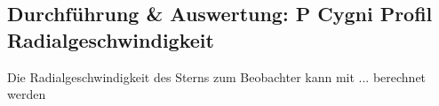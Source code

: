 \subsection{Durchführung \& Auswertung: P Cygni Profil\\Radialgeschwindigkeit}
Die Radialgeschwindigkeit des Sterns zum Beobachter kann mit ... berechnet werden %
